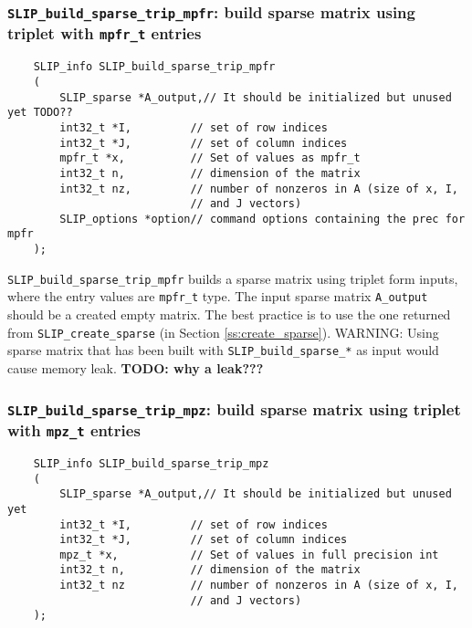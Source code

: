 \documentclass[12pt]{article}
\theoremstyle{definition}
\begin{document}
\cprotect\subsubsection{\verb|SLIP_build_sparse_trip_mpfr|: build sparse matrix using triplet with \verb|mpfr_t| entries}
\label{s:user:build_sparse_trip_mpfr}

\begin{mdframed}[userdefinedwidth=6in]
{\footnotesize
\begin{verbatim}
    SLIP_info SLIP_build_sparse_trip_mpfr
    (
        SLIP_sparse *A_output,// It should be initialized but unused yet TODO??
        int32_t *I,         // set of row indices
        int32_t *J,         // set of column indices
        mpfr_t *x,          // Set of values as mpfr_t
        int32_t n,          // dimension of the matrix
        int32_t nz,         // number of nonzeros in A (size of x, I,
                            // and J vectors)
        SLIP_options *option// command options containing the prec for mpfr
    );
\end{verbatim}
} \end{mdframed}

\verb|SLIP_build_sparse_trip_mpfr| builds a sparse matrix using triplet form
inputs, where the entry values are \verb|mpfr_t| type. The input sparse matrix
\verb|A_output| should be a created empty matrix. The best practice is to use
the one returned from \verb|SLIP_create_sparse| (in Section
\ref{ss:create_sparse}). WARNING: Using sparse matrix that has been built with
\verb|SLIP_build_sparse_*| as input would cause memory leak.
{\bf TODO: why a leak???} %

\cprotect\subsubsection{\verb|SLIP_build_sparse_trip_mpz|: build sparse matrix using triplet with \verb|mpz_t| entries}
\label{s:user:build_sparse_trip_mpz}

\begin{mdframed}[userdefinedwidth=6in]
{\footnotesize
\begin{verbatim}
    SLIP_info SLIP_build_sparse_trip_mpz
    (
        SLIP_sparse *A_output,// It should be initialized but unused yet
        int32_t *I,         // set of row indices
        int32_t *J,         // set of column indices
        mpz_t *x,           // Set of values in full precision int
        int32_t n,          // dimension of the matrix
        int32_t nz          // number of nonzeros in A (size of x, I,
                            // and J vectors)
    );
\end{verbatim}
} \end{mdframed}
\end{document}
